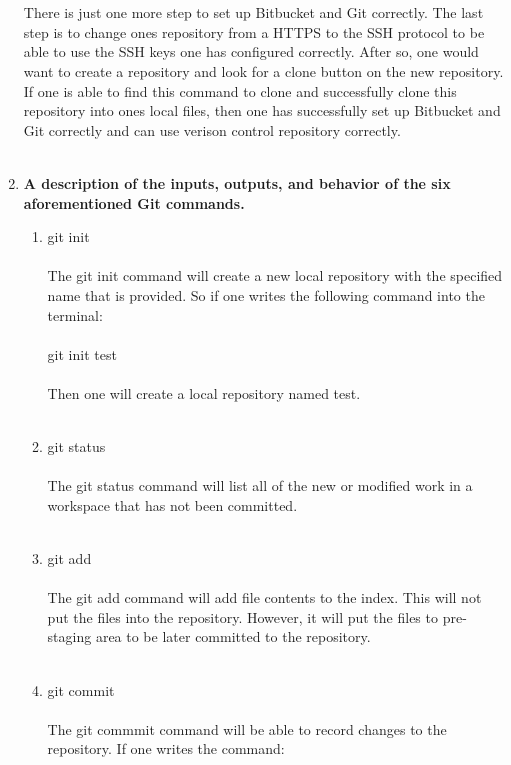 \documentclass{article}
\begin{document}
\begin{enumerate}
\\
\\
There is just one more step to set up Bitbucket and Git correctly. The last step is to change ones repository from a HTTPS to the SSH protocol to be able to use the SSH keys one has configured correctly. After so, one would want to create a repository and look for a clone button on the new repository. If one is able to find this command to clone and successfully clone this repository into ones local files, then one has successfully set up Bitbucket and Git correctly and can use verison control repository correctly.
\\
\\
\item \textbf{{A description of the inputs, outputs, and behavior of the six aforementioned Git commands.}}
\begin{enumerate}
\item {git init}
\\
\\
The git init command will create a new local repository with the specified name that is provided. So if one writes the following command into the terminal: 
\\
\\
git init test 
\\
\\
Then one will create a local repository named test.
\\
\\
\item {git status}
\\
\\
The git status command will list all of the new or modified work in a workspace that has not been committed.
\\
\\
\item {git add}
\\
\\
The git add command will add file contents to the index. This will not put the files into the repository. However, it will put the files to pre-staging area to be later committed to the repository.
\\
\\
\item {git commit}
\\
\\
The git commmit command will be able to record changes to the repository. If one writes the command: 
\\
\\

\end{enumerate}
\end{enumerate}
\end{document}
